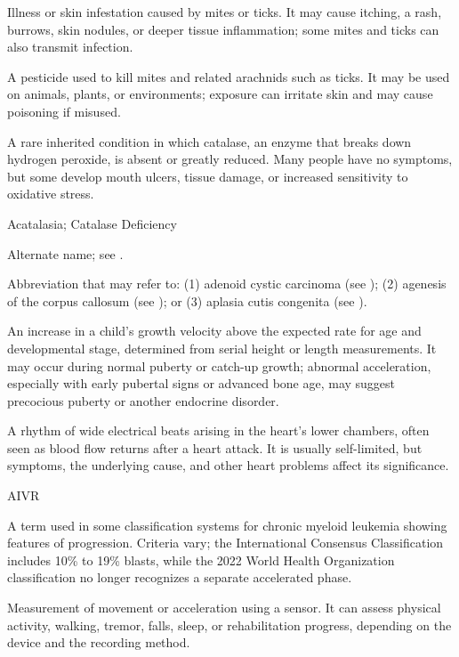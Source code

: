 Illness or skin infestation caused by mites or ticks. It may cause itching, a rash, burrows, skin nodules, or deeper tissue inflammation; some mites and ticks can also transmit infection.

 A pesticide used to kill mites and related arachnids such as ticks. It may be used on animals, plants, or environments; exposure can irritate skin and may cause poisoning if misused.

 A rare inherited condition in which catalase, an enzyme that breaks down hydrogen peroxide, is absent or greatly reduced. Many people have no symptoms, but some develop mouth ulcers, tissue damage, or increased sensitivity to oxidative stress.

\synonyms
Acatalasia; Catalase Deficiency

 Alternate name; see .

 Abbreviation that may refer to: (1) adenoid cystic carcinoma (see ); (2) agenesis of the corpus callosum (see ); or (3) aplasia cutis congenita (see ).

 An increase in a child's growth velocity above the expected rate for age and developmental stage, determined from serial height or length measurements. It may occur during normal puberty or catch-up growth; abnormal acceleration, especially with early pubertal signs or advanced bone age, may suggest precocious puberty or another endocrine disorder.

 A rhythm of wide electrical beats arising in the heart's lower chambers, often seen as blood flow returns after a heart attack. It is usually self-limited, but symptoms, the underlying cause, and other heart problems affect its significance.

\synonyms
AIVR

 A term used in some classification systems for chronic myeloid leukemia showing features of progression. Criteria vary; the International Consensus Classification includes 10\% to 19\% blasts, while the 2022 World Health Organization classification no longer recognizes a separate accelerated phase.

 Measurement of movement or acceleration using a sensor. It can assess physical activity, walking, tremor, falls, sleep, or rehabilitation progress, depending on the device and the recording method.

